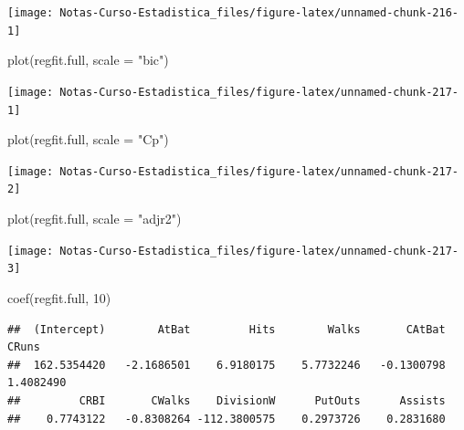 \documentclass[
  12pt,
]{book}
\newenvironment{Shaded}{\begin{snugshade}}{\end{snugshade}}
\newcommand{\AttributeTok}[1]{\textcolor[rgb]{0.77,0.63,0.00}{#1}}
\newcommand{\DecValTok}[1]{\textcolor[rgb]{0.00,0.00,0.81}{#1}}
\newcommand{\FunctionTok}[1]{\textcolor[rgb]{0.00,0.00,0.00}{#1}}
\newcommand{\NormalTok}[1]{#1}
\newcommand{\StringTok}[1]{\textcolor[rgb]{0.31,0.60,0.02}{#1}}
\theoremstyle{definition}
\theoremstyle{definition}
\theoremstyle{definition}
\theoremstyle{definition}
\theoremstyle{remark}
\begin{document}
\begin{center}\texttt{[image: Notas-Curso-Estadistica\_files/figure-latex/unnamed-chunk-216-1]} \end{center}

\begin{Shaded}
\begin{Highlighting}[]
\FunctionTok{plot}\NormalTok{(regfit.full, }\AttributeTok{scale =} \StringTok{"bic"}\NormalTok{)}
\end{Highlighting}
\end{Shaded}

\begin{center}\texttt{[image: Notas-Curso-Estadistica\_files/figure-latex/unnamed-chunk-217-1]} \end{center}

\begin{Shaded}
\begin{Highlighting}[]
\FunctionTok{plot}\NormalTok{(regfit.full, }\AttributeTok{scale =} \StringTok{"Cp"}\NormalTok{)}
\end{Highlighting}
\end{Shaded}

\begin{center}\texttt{[image: Notas-Curso-Estadistica\_files/figure-latex/unnamed-chunk-217-2]} \end{center}

\begin{Shaded}
\begin{Highlighting}[]
\FunctionTok{plot}\NormalTok{(regfit.full, }\AttributeTok{scale =} \StringTok{"adjr2"}\NormalTok{)}
\end{Highlighting}
\end{Shaded}

\begin{center}\texttt{[image: Notas-Curso-Estadistica\_files/figure-latex/unnamed-chunk-217-3]} \end{center}

\begin{Shaded}
\begin{Highlighting}[]
\FunctionTok{coef}\NormalTok{(regfit.full, }\DecValTok{10}\NormalTok{)}
\end{Highlighting}
\end{Shaded}

\begin{verbatim}
##  (Intercept)        AtBat         Hits        Walks       CAtBat        CRuns 
##  162.5354420   -2.1686501    6.9180175    5.7732246   -0.1300798    1.4082490 
##         CRBI       CWalks    DivisionW      PutOuts      Assists 
##    0.7743122   -0.8308264 -112.3800575    0.2973726    0.2831680
\end{verbatim}
\end{document}
